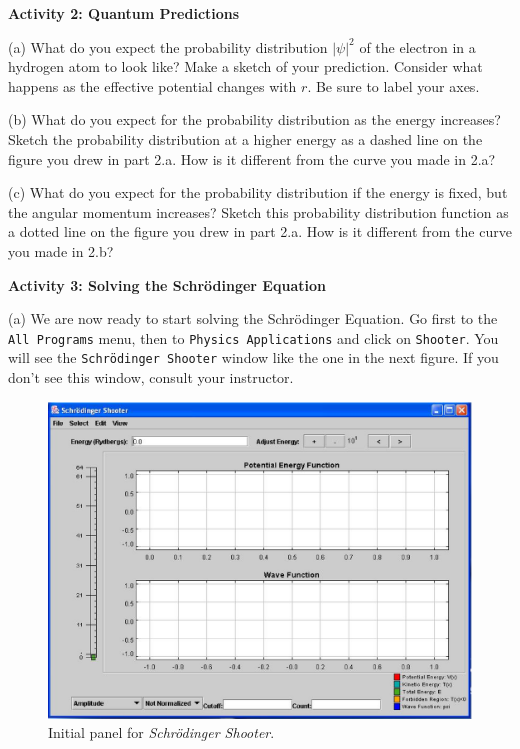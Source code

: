 \textbf{Activity 2: Quantum Predictions}

(a) What do you expect the probability distribution $|\psi|^2$ 
of the electron in a hydrogen atom to look like?
Make a sketch of your prediction.
Consider what happens
as the effective potential changes with $r$.
Be sure to label your axes.
\vskip 4.0cm

\newpage

(b) What do you expect for the probability distribution as the energy increases?
Sketch the probability distribution at a higher energy as
a dashed line on the figure you drew in part 2.a.
How is it different from the curve you made in 2.a?
\vskip 4.0cm

(c) What do you expect for the  probability distribution if the energy is fixed, but the
angular momentum increases?
Sketch this probability distribution function as
a dotted line on the figure you drew in part 2.a.
How is it different from the curve you made in 2.b?
\vskip 4.0cm

\textbf{Activity 3: Solving the Schr\"odinger Equation}

(a) We are now ready to start solving the Schr\"odinger Equation.
Go first to the {\tt All Programs} menu, then
to {\tt Physics Applications} and click on {\tt Shooter}.
You will see the {\tt Schr\"odinger Shooter} window like the one in the next figure.
If you don't see this window, consult your instructor.
\begin{figure}[hbt]
\begin{center}
\includegraphics[width=5.0in]{qmProbability/shooter1b.eps}
\caption{Initial panel for {\it Schr\"odinger Shooter}.}
\end{center}
\end{figure}

